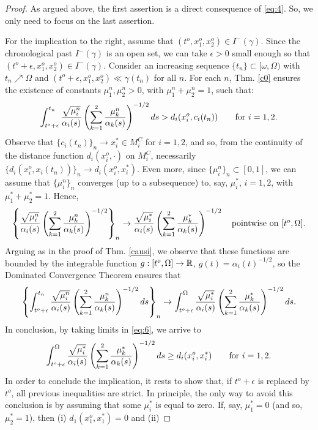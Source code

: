 \begin{proof}
As argued above, the first assertion is a direct consequence of \eqref{eq:4}. So, we only need to focus on the last assertion.

For the implication to the right, assume that $(t^o,x_1^o,x_2^o)\in I^-(\gamma)$. Since the chronological past $I^-(\gamma)$ is an open set, we can take $\epsilon >0$ small enough so that $(t^o+\epsilon,x_1^o,x_2^o)\in I^-(\gamma)$. Consider an increasing sequence $\{t_n\}\subset [\omega,\Omega)$ with $t_n\nearrow \Omega$ and $(t^o+\epsilon,x_1^o,x_2^o)\ll \gamma(t_n)$ for all $n$. For each $n$, Thm. \ref{c0} ensures the existence of constants $\mu_1^n,\mu_2^n>0$, with $\mu^n_1+\mu^n_2=1$, such that:
  \begin{equation}\label{eq:6}
\int_{t^{o}+\epsilon}^{t_n} \frac{\sqrt{\mu^n_{i}}}{\alpha_{i}(s)}\left(\sum_{k=1}^{2} \frac{\mu^n_{k}}{\alpha_{k}(s)} \right)^{-1/2}ds >
d_{i}(x^{o}_{i},c_{i}(t_n))\qquad\hbox{for $i=1,2$.}
    \end{equation}
    Observe that $\{c_i(t_n)\}_n\rightarrow x_i^*\in M_i^C$ for $i=1,2$, and so, from the continuity of the distance function $d_i(x_i^o,\cdot)$ on $M_i^C$, necessarily $\{d_i(x_i^o,x_i(t_n))\}_n\rightarrow d_i(x_i^o,x_i^*)$. Even more, since $\{\mu^n_i\}_n\subset [0,1]$, we can assume that $\{\mu^n_i\}_n$ converges (up to a subsequence) to, say, $\mu_i^*$, $i=1,2$, with $\mu_1^*+\mu_2^*=1$. Hence,
    \[
\left\{\frac{\sqrt{\mu^n_{i}}}{\alpha_{i}(s)}\left(\sum_{k=1}^2 \frac{\mu_{k}^n}{\alpha_{k}(s)}\right)^{-1/2} \right\}_n\rightarrow \frac{\sqrt{\mu^*_{i}}}{\alpha_{i}(s)}\left(\sum_{k=1}^2 \frac{\mu_{k}^*}{\alpha_{k}(s)}\right)^{-1/2}\quad\hbox{pointwise on $[t^o,\Omega]$.}
    \]
    Arguing as in the proof of Thm. \ref{causi}, we observe that these functions are bounded by the integrable function $g:[t^o,\Omega]\rightarrow{\mathbb R}$, $g(t)=\alpha_i(t)^{-1/2}$, so the Dominated Convergence Theorem ensures that
   \[
\left\{\int_{t^{o}+\epsilon}^{t_n} \frac{\sqrt{\mu^n_{i}}}{\alpha_{i}(s)}\left(\sum_{k=1}^{2} \frac{\mu^n_{k}}{\alpha_{k}(s)} \right)^{-1/2}ds\right\}_n\rightarrow \int_{t^{o}+\epsilon}^{\Omega} \frac{\sqrt{\mu^*_{i}}}{\alpha_{i}(s)}\left(\sum_{k=1}^{2} \frac{\mu^*_{k}}{\alpha_{k}(s)} \right)^{-1/2}ds.
    \]
    In conclusion, by taking limits in \eqref{eq:6}, we arrive to
    \[
\int_{t^{o}+\epsilon}^{\Omega} \frac{\sqrt{\mu^*_{i}}}{\alpha_{i}(s)}\left(\sum_{k=1}^{2} \frac{\mu^*_{k}}{\alpha_{k}(s)} \right)^{-1/2}ds\geq d_i(x_i^o,x_i^*)\qquad\hbox{for $i=1,2$.}
      \]
      In order to conclude the implication, it rests to show that, if $t^o+\epsilon$ is replaced by $t^o$, all previous inequalities are strict. In principle, the only way to avoid this conclusion is by assuming that some $\mu_i^*$ is equal to zero. If, say, $\mu_1^*=0$ (and so, $\mu_2^*=1$), then (i) $d_1(x_1^o,x_1^*)=0$ and (ii)

\end{proof}
